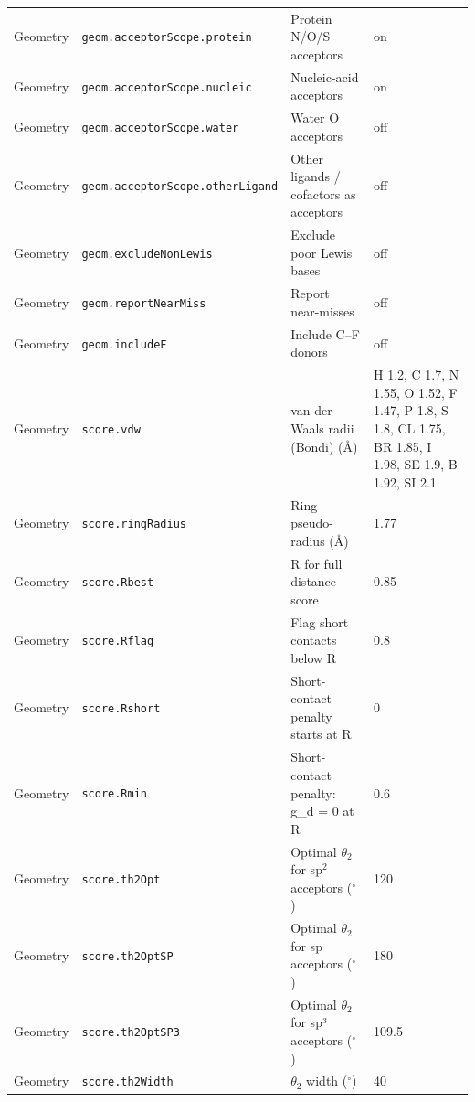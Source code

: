 {\begin{longtable}{llp{4.2cm}l}
Geometry & \texttt{geom.acceptorScope.protein} & Protein N/O/S acceptors & \parbox[t]{5.0cm}{\raggedright on}\\
Geometry & \texttt{geom.acceptorScope.nucleic} & Nucleic-acid acceptors & \parbox[t]{5.0cm}{\raggedright on}\\
Geometry & \texttt{geom.acceptorScope.water} & Water O acceptors & \parbox[t]{5.0cm}{\raggedright off}\\
Geometry & \texttt{geom.acceptorScope.otherLigand} & Other ligands / cofactors as acceptors & \parbox[t]{5.0cm}{\raggedright off}\\
Geometry & \texttt{geom.excludeNonLewis} & Exclude poor Lewis bases & \parbox[t]{5.0cm}{\raggedright off}\\
Geometry & \texttt{geom.reportNearMiss} & Report near-misses & \parbox[t]{5.0cm}{\raggedright off}\\
Geometry & \texttt{geom.includeF} & Include C--F donors & \parbox[t]{5.0cm}{\raggedright off}\\
Geometry & \texttt{score.vdw} & van der Waals radii (Bondi) (\AA{}) & \parbox[t]{5.0cm}{\raggedright H 1.2, C 1.7, N 1.55, O 1.52, F 1.47, P 1.8, S 1.8, CL 1.75, BR 1.85, I 1.98, SE 1.9, B 1.92, SI 2.1}\\
Geometry & \texttt{score.ringRadius} & Ring pseudo-radius (\AA{}) & \parbox[t]{5.0cm}{\raggedright 1.77}\\
Geometry & \texttt{score.Rbest} & R for full distance score & \parbox[t]{5.0cm}{\raggedright 0.85}\\
Geometry & \texttt{score.Rflag} & Flag short contacts below R & \parbox[t]{5.0cm}{\raggedright 0.8}\\
Geometry & \texttt{score.Rshort} & Short-contact penalty starts at R & \parbox[t]{5.0cm}{\raggedright 0}\\
Geometry & \texttt{score.Rmin} & Short-contact penalty: g\_d = 0 at R & \parbox[t]{5.0cm}{\raggedright 0.6}\\
Geometry & \texttt{score.th2Opt} & Optimal $\theta_2$ for sp$^2$ acceptors ($^\circ$) & \parbox[t]{5.0cm}{\raggedright 120}\\
Geometry & \texttt{score.th2OptSP} & Optimal $\theta_2$ for sp acceptors ($^\circ$) & \parbox[t]{5.0cm}{\raggedright 180}\\
Geometry & \texttt{score.th2OptSP3} & Optimal $\theta_2$ for sp³ acceptors ($^\circ$) & \parbox[t]{5.0cm}{\raggedright 109.5}\\
Geometry & \texttt{score.th2Width} & $\theta_2$ width ($^\circ$) & \parbox[t]{5.0cm}{\raggedright 40}\\

\end{longtable}}
